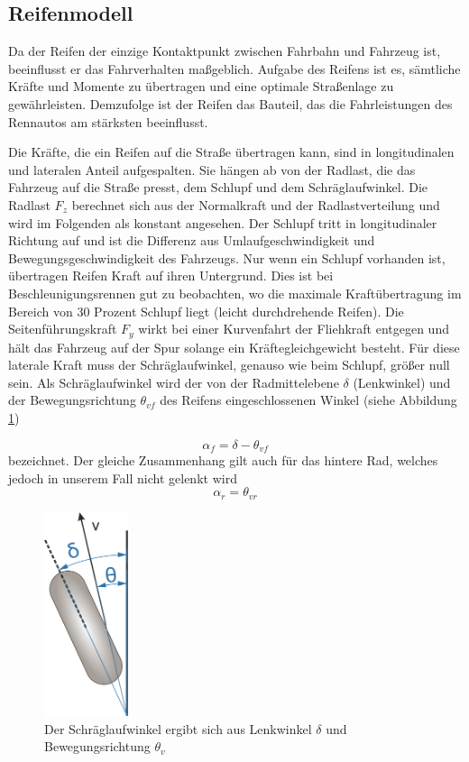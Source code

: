 \documentclass{like}
\begin{document}
\subsection{Reifenmodell}
\label{tireModel}
Da der Reifen der einzige Kontaktpunkt zwischen Fahrbahn und Fahrzeug ist, beeinflusst er das Fahrverhalten maßgeblich. Aufgabe des Reifens ist es, sämtliche Kräfte und Momente zu übertragen und eine optimale Straßenlage zu gewährleisten. Demzufolge ist der Reifen das Bauteil, das die Fahrleistungen des Rennautos am stärksten beeinflusst.

Die Kräfte, die ein Reifen auf die Straße übertragen kann, sind in longitudinalen und lateralen Anteil aufgespalten. Sie hängen ab von der Radlast, die das Fahrzeug auf die Straße presst, dem Schlupf und dem Schräglaufwinkel. Die Radlast \(F_z\) berechnet sich aus der Normalkraft und der Radlastverteilung und wird im Folgenden als konstant angesehen. Der Schlupf tritt in longitudinaler Richtung auf und ist die Differenz aus Umlaufgeschwindigkeit und Bewegungsgeschwindigkeit des Fahrzeugs.
Nur wenn ein Schlupf vorhanden ist, übertragen Reifen Kraft auf ihren Untergrund. Dies ist bei Beschleunigungsrennen gut zu beobachten, wo die maximale Kraftübertragung im Bereich von 30 Prozent Schlupf liegt (leicht durchdrehende Reifen).
Die Seitenführungskraft \(F_y\) wirkt bei einer Kurvenfahrt der Fliehkraft entgegen und hält das Fahrzeug auf der Spur solange ein Kräftegleichgewicht besteht. Für diese laterale Kraft muss der Schräglaufwinkel, genauso wie beim Schlupf, größer null sein. Als Schräglaufwinkel wird der von der Radmittelebene \(\delta\) (Lenkwinkel) und der Bewegungsrichtung \(\theta_{vf}\) des Reifens eingeschlossenen Winkel (siehe Abbildung \ref{fig:linLat})

\begin{equation}
\alpha_f = \delta - \theta_{vf}
\end{equation}
bezeichnet. Der gleiche Zusammenhang gilt auch für das hintere Rad, welches jedoch in unserem Fall nicht gelenkt wird
\begin{equation}
\alpha_r = \theta_{vr}
\end{equation}


\begin{figure}[ht!]
	\centering
	\includegraphics[width=70pt]{Abbildungen/slipAngle.png}
	\caption{Der Schräglaufwinkel ergibt sich aus Lenkwinkel \(\delta\) und Bewegungsrichtung \(\theta_{v}\)}
	\label{fig:linLat}
\end{figure}
\end{document}
